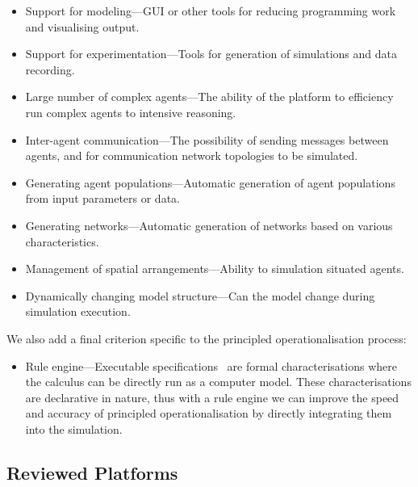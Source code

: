 \begin{itemize}
\item Support for modeling---\ac{GUI} or other tools for reducing programming work and visualising output.
\item Support for experimentation---Tools for generation of simulations and data recording.
\item Large number of complex agents---The ability of the platform to efficiency run complex agents to intensive reasoning.
\item Inter-agent communication---The possibility of sending messages between agents, and for communication network topologies to be simulated.
\item Generating agent populations---Automatic generation of agent populations from input parameters or data.
\item Generating networks---Automatic generation of networks based on various characteristics.
\item Management of spatial arrangements---Ability to simulation situated agents.
\item Dynamically changing model structure---Can the model change during simulation execution.
\end{itemize}

We also add a final criterion specific to the principled operationalisation process:
\begin{itemize}
\item Rule engine---Executable specifications~\citep{Artikis2010} are formal characterisations where the calculus can be directly run as a computer model. These characterisations are declarative in nature, thus with a rule engine we can improve the speed and accuracy of principled operationalisation by directly integrating them into the simulation.
\end{itemize}

\subsection{Reviewed Platforms}

